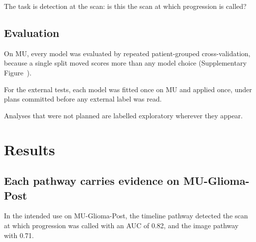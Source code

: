 \documentclass[largeformat]{interact} %
\begin{document}
The task is detection at the scan: is this the scan at which progression is called?

\subsection{Evaluation}\label{sec:2.3}

On MU, every model was evaluated by repeated patient-grouped cross-validation, because a single split moved scores
more than any model choice (Supplementary Figure~).

For the external tests, each model was fitted once on MU and applied once, under plans committed before any external
label was read.

Analyses that were not planned are labelled exploratory wherever they appear.

\section{Results}\label{sec:3}

\subsection{Each pathway carries evidence on MU-Glioma-Post}\label{sec:3.1}

In the intended use on MU-Glioma-Post, the timeline pathway detected the scan at which progression was called with an
AUC of 0.82, and the image pathway with 0.71.
\end{document}
